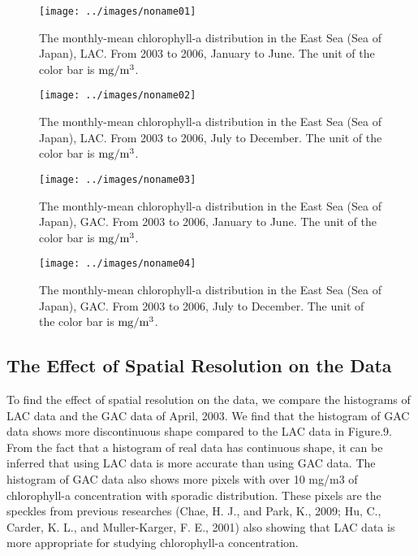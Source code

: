 \begin{figure}[t]
	\centering
	\texttt{[image: ../images/noname01]}\\
	\caption{The monthly-mean chlorophyll-a distribution in the East Sea (Sea of Japan), LAC. From 2003 to 2006, January to June. The unit of the color bar is $\rm mg/m^3$.}
	\label{fig:noname01}
\end{figure}
 

\begin{figure}
	\centering
	\texttt{[image: ../images/noname02]}
	\caption{The monthly-mean chlorophyll-a distribution in the East Sea (Sea of Japan), LAC. From 2003 to 2006, July to December. The unit of the color bar is $\rm mg/m^3$.}
	\label{fig:noname02}
\end{figure}

\begin{figure}
	\centering
	\texttt{[image: ../images/noname03]}
	\caption{The monthly-mean chlorophyll-a distribution in the East Sea (Sea of Japan), GAC. From 2003 to 2006, January to June. The unit of the color bar is $\rm mg/m^3$.}
	\label{fig:noname03}
\end{figure}

\begin{figure}
	\centering
	\texttt{[image: ../images/noname04]}
	\caption{The monthly-mean chlorophyll-a distribution in the East Sea (Sea of Japan), GAC. From 2003 to 2006, July to December. The unit of the color bar is $\rm mg/m^3$.}
	\label{fig:noname04}
\end{figure}
 
\subsection{The Effect of Spatial Resolution on the Data}
 
To find the effect of spatial resolution on the data, we compare the histograms of LAC data and the GAC data of April, 2003. We find that the histogram of GAC data shows more discontinuous shape compared to the LAC data in Figure.9. From the fact that a histogram of real data has continuous shape, it can be inferred that using LAC data is more accurate than using GAC data. The histogram of GAC data also shows more pixels with over 10 mg/m3 of chlorophyll-a concentration with sporadic distribution. These pixels are the speckles from previous researches (Chae, H. J., and Park, K., 2009; Hu, C., Carder, K. L., and Muller-Karger, F. E., 2001) also showing that LAC data is more appropriate for studying chlorophyll-a concentration.
  
